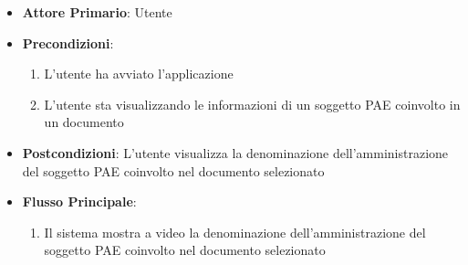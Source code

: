 \begin{itemize}
    \item \textbf{Attore Primario}: Utente
    \item \textbf{Precondizioni}:
    \begin{enumerate}
        \item L'utente ha avviato l'applicazione
        \item L'utente sta visualizzando le informazioni di un soggetto PAE coinvolto in un documento
    \end{enumerate}
    \item \textbf{Postcondizioni}: L'utente visualizza la denominazione dell'amministrazione del soggetto PAE coinvolto nel documento selezionato
    \item \textbf{Flusso Principale}:
        \begin{enumerate}
            \item Il sistema mostra a video la denominazione dell'amministrazione del soggetto PAE coinvolto nel documento selezionato
        \end{enumerate}
\end{itemize}

